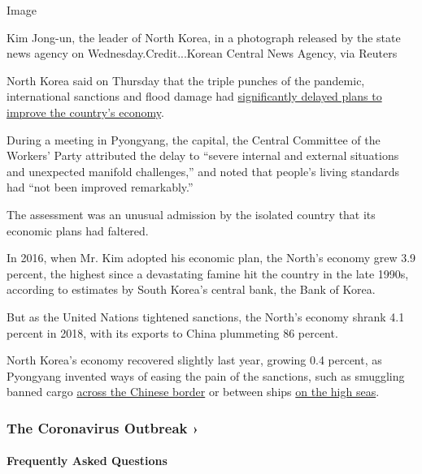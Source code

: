 Image

Kim Jong-un, the leader of North Korea, in a photograph released by the
state news agency on Wednesday.Credit...Korean Central News Agency, via
Reuters

North Korea said on Thursday that the triple punches of the pandemic,
international sanctions and flood damage had
\href{https://www.nytimes3xbfgragh.onion/2020/08/19/world/asia/north-korea-economy-coronavirus.html}{significantly
delayed plans to improve the country's economy}.

During a meeting in Pyongyang, the capital, the Central Committee of the
Workers' Party attributed the delay to ``severe internal and external
situations and unexpected manifold challenges,'' and noted that people's
living standards had ``not been improved remarkably.''

The assessment was an unusual admission by the isolated country that its
economic plans had faltered.

In 2016, when Mr. Kim adopted his economic plan, the North's economy
grew 3.9 percent, the highest since a devastating famine hit the country
in the late 1990s, according to estimates by South Korea's central bank,
the Bank of Korea.

But as the United Nations tightened sanctions, the North's economy
shrank 4.1 percent in 2018, with its exports to China plummeting 86
percent.

North Korea's economy recovered slightly last year, growing 0.4 percent,
as Pyongyang invented ways of easing the pain of the sanctions, such as
smuggling banned cargo
\href{http://vod.kbs.co.kr/index.html?source=episode\&sname=vod\&stype=vod\&program_code=T2011-1097\&program_id=PS-2019197532-01-000\&section_code=05\&broadcast_complete_yn=N\&local_station_code=00\&section_sub_code=06}{across
the Chinese border} or between ships
\href{https://www.nytimes3xbfgragh.onion/2018/01/18/world/asia/north-korea-oil-smuggling.html}{on
the high seas}.

\href{https://www.nytimes3xbfgragh.onion/news-event/coronavirus?action=click\&pgtype=Article\&state=default\&region=MAIN_CONTENT_3\&context=storylines_faq}{}

\hypertarget{the-coronavirus-outbreak-}{%
\subsubsection{The Coronavirus Outbreak
›}\label{the-coronavirus-outbreak-}}

\hypertarget{frequently-asked-questions}{%
\paragraph{Frequently Asked
Questions}\label{frequently-asked-questions}}

